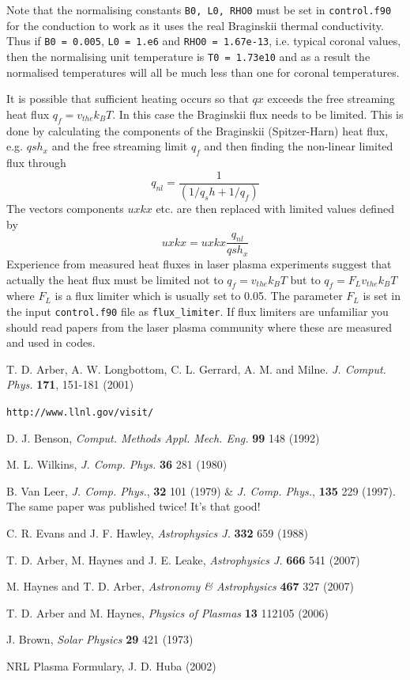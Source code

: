 \documentclass[11pt]{article}
\begin{document}
Note that the normalising constants \texttt{B0, L0, RHO0} must be set in \texttt{control.f90} for the conduction to work as it uses the real Braginskii thermal conductivity. Thus if \texttt{B0 = 0.005}, \texttt{L0 = 1.e6} and \texttt{RHO0 = 1.67e-13}, i.e. typical coronal values, then the normalising unit temperature is \texttt{T0 = 1.73e10} and as a result the normalised temperatures will all be much less than one for coronal temperatures.  

It is possible that sufficient heating occurs so that $qx$ exceeds the free streaming heat flux $q_f=v_{the} k_B T$. In this case the Braginskii flux needs to be limited. This is done by calculating the components of the Braginskii (Spitzer-Harn) heat flux, e.g. $qsh_x$ and the free streaming limit $q_f$ and then finding the non-linear limited flux through
\[
q_{nl} = \frac{1}{(1/q_sh + 1/q_f)}
\] 
The vectors components $uxkx$ etc. are then replaced with limited values defined by 
\[
uxkx=uxkx\frac{q_{nl}}{qsh_x}
\]
Experience from measured heat fluxes in laser plasma experiments suggest that actually the heat flux must be limited not to $q_f=v_{the} k_B T$ but to $q_f=F_L v_{the} k_B T$  where $F_L$ is a flux limiter which is usually set to 0.05. The parameter $F_L$ is set in the input \texttt{control.f90} file as \texttt{flux\_limiter}. If flux limiters are unfamiliar you should read papers from the laser plasma community where these are measured and used in codes.
                                                 

\newpage
\begin{thebibliography}{}

 T. D. Arber, A. W. Longbottom, C. L. Gerrard, A. M. and Milne. \textit{J. Comput. Phys.} \textbf{171}, 151-181 (2001)

 \texttt{http://www.llnl.gov/visit/}

 D. J. Benson, \textit{Comput. Methods Appl. Mech. Eng.} \textbf{99} 148 (1992) 

 M. L. Wilkins, \textit{J. Comp. Phys.} \textbf{36} 281 (1980)

 B. Van Leer, \textit{J. Comp. Phys.}, \textbf{32} 101 (1979)  \& \textit{J. Comp. Phys.}, \textbf{135} 229 (1997). The same paper was published twice! It's that good!

 C. R. Evans and J. F. Hawley, \textit{Astrophysics J.} \textbf{332} 659 (1988) 

 T. D. Arber, M. Haynes and J. E. Leake, {\it Astrophysics J.} \textbf{666} 541 (2007)

 M. Haynes and T. D. Arber, \textit{Astronomy \& Astrophysics } \textbf{467} 327 (2007)

 T. D. Arber and M. Haynes, \textit{Physics of Plasmas} \textbf{13} 112105 (2006)

 J. Brown, \textit{Solar Physics} \textbf{29} 421 (1973)

 NRL Plasma Formulary, J. D. Huba (2002)

\end{thebibliography}
\end{document}

